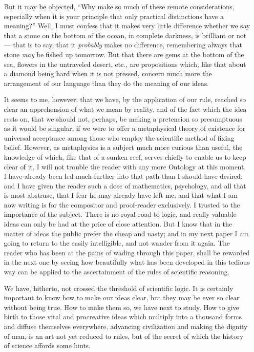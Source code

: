 But it may be objected, ``Why make so much of these remote considerations, especially when it is your principle that only practical distinctions have a meaning?'' Well, I must confess that it makes very little difference whether we say that a stone on the bottom of the ocean, in complete darkness, is brilliant or not--- that is to say, that it
\emph{probably} makes no difference, remembering always that stone \emph{may} be fished up tomorrow. But that there are gems at the bottom of the sea, flowers in the untraveled desert, etc., are propositions which,  like that about a diamond being hard when it is not pressed, concern much more the arrangement of our language than they do the meaning of our ideas. 

It seems to me, however, that we have, by the
application of our rule, reached so clear an apprehension of what we mean by reality, and of the fact which the idea rests on, that we should not, perhaps, be making a pretension so presumptuous as it would be singular, if we were to
offer a metaphysical theory of existence for universal acceptance among those who employ the scientific method of fixing belief. However, as metaphysics is a subject much more curious than useful, the knowledge of which, like that of a sunken reef, serves chiefly to enable us to keep clear of it, I will not trouble the reader with any more Ontology at this moment. I have already been led much further into that path than I should have desired; and I have given the reader such a dose of mathematics, psychology, and all that is most abstruse, that I fear he may already have left me, and that what I am now writing is for the compositor and proof-reader exclusively. I trusted to the
importance of the subject. There is no royal road to logic, and really valuable ideas can only be had at the price of close attention. But I know that in the matter of ideas the public prefer the cheap and nasty; and in my next paper I am going to return to the easily intelligible, and not wander from it again. The reader who has been at the pains of wading through this paper, shall be rewarded in the next one by seeing how beautifully what has been developed in this tedious way can be applied to the ascertainment of the rules of scientific reasoning.


We have, hitherto, not crossed the threshold of scientific logic. It  is certainly important to know how to make our ideas clear, but they may be ever so clear without being true. How to make them so, we have next to study. How to give birth to those vital and procreative ideas which multiply into a thousand forms and diffuse themselves everywhere, advancing civilization and making the dignity of man, is an art not yet reduced to rules, but of the secret of which the history of science affords some hints.


